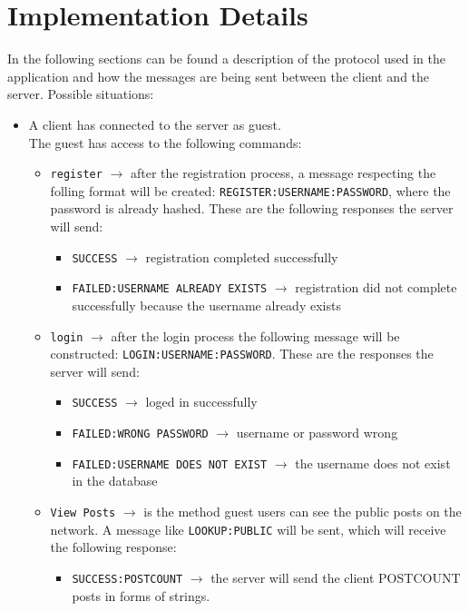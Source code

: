\documentclass[runningheads, a4paper]{llncs}
\begin{document}
\section{Implementation Details}
In the following sections can be found a description of the protocol used in the application and how the messages are being sent between the client and the server.
Possible situations:
\begin{itemize}
    \item A client has connected to the server as guest.\\
    The guest has access to the following commands:
    \begin{itemize}
        \item \texttt{register} $\rightarrow$ after the registration process, a message respecting the folling format will be created: \texttt{REGISTER:USERNAME:PASSWORD}, where the password is already hashed. These are the following responses the server will send:
        \begin{itemize}
            \item \texttt{SUCCESS} $\rightarrow$ registration completed successfully
            \item \texttt{FAILED:USERNAME ALREADY EXISTS} $\rightarrow$ registration did not complete successfully because the username already exists
        \end{itemize}
        \item \texttt{login} $\rightarrow$ after the login process the following message will be constructed: \texttt{LOGIN:USERNAME:PASSWORD}. These are the responses the server will send:
        \begin{itemize}
            \item \texttt{SUCCESS} $\rightarrow$ loged in successfully
            \item \texttt{FAILED:WRONG PASSWORD} $\rightarrow$ username or password wrong
            \item \texttt{FAILED:USERNAME DOES NOT EXIST} $\rightarrow$ the username does not exist in the database
        \end{itemize}
        \item \texttt{View Posts} $\rightarrow$ is the method guest users can see the public posts on the network. A message like \texttt{LOOKUP:PUBLIC} will be sent, which will receive the following response:
        \begin{itemize}
            \item \texttt{SUCCESS:POSTCOUNT} $\rightarrow$ the server will send the client POSTCOUNT posts in forms of strings.

\end{itemize}
\end{itemize}
\end{itemize}
\end{document}
